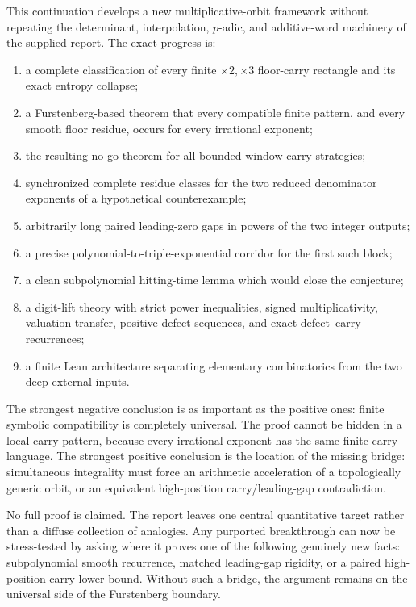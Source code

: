 \documentclass[11pt]{article}
\theoremstyle{definition}
\theoremstyle{remark}
\begin{document}
This continuation develops a new multiplicative-orbit framework without repeating
the determinant, interpolation, $p$-adic, and additive-word machinery of the supplied
report.  The exact progress is:

\begin{enumerate}
\item a complete classification of every finite $\times2,\times3$ floor-carry
rectangle and its exact entropy collapse;
\item a Furstenberg-based theorem that every compatible finite pattern, and every
smooth floor residue, occurs for every irrational exponent;
\item the resulting no-go theorem for all bounded-window carry strategies;
\item synchronized complete residue classes for the two reduced denominator
exponents of a hypothetical counterexample;
\item arbitrarily long paired leading-zero gaps in powers of the two integer outputs;
\item a precise polynomial-to-triple-exponential corridor for the first such block;
\item a clean subpolynomial hitting-time lemma which would close the conjecture;
\item a digit-lift theory with strict power inequalities, signed multiplicativity,
valuation transfer, positive defect sequences, and exact defect--carry recurrences;
\item a finite Lean architecture separating elementary combinatorics from the two
deep external inputs.
\end{enumerate}

The strongest negative conclusion is as important as the positive ones: finite
symbolic compatibility is completely universal.  The proof cannot be hidden in a
local carry pattern, because every irrational exponent has the same finite carry
language.  The strongest positive conclusion is the location of the missing bridge:
simultaneous integrality must force an arithmetic acceleration of a topologically
generic orbit, or an equivalent high-position carry/leading-gap contradiction.

No full proof is claimed.  The report leaves one central quantitative target rather
than a diffuse collection of analogies.  Any purported breakthrough can now be
stress-tested by asking where it proves one of the following genuinely new facts:
subpolynomial smooth recurrence, matched leading-gap rigidity, or a paired
high-position carry lower bound.  Without such a bridge, the argument remains on the
universal side of the Furstenberg boundary.
\end{document}
